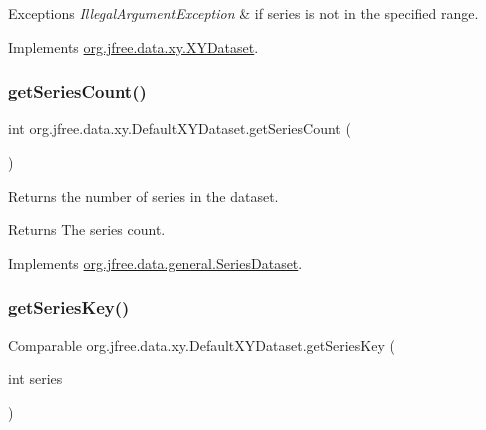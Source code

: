\begin{DoxyExceptions}{Exceptions}
{\em Illegal\+Argument\+Exception} & if {\ttfamily series} is not in the specified range. \\
\hline
\end{DoxyExceptions}


Implements \mbox{\hyperlink{interfaceorg_1_1jfree_1_1data_1_1xy_1_1_x_y_dataset_ae81f9de91dfcae45028fc8a486a119da}{org.\+jfree.\+data.\+xy.\+X\+Y\+Dataset}}.

\mbox{\label{classorg_1_1jfree_1_1data_1_1xy_1_1_default_x_y_dataset_a0e11a4936eb729adf611cb44013abc5b}} 
\subsubsection{\texorpdfstring{get\+Series\+Count()}{getSeriesCount()}}
{\footnotesize\ttfamily int org.\+jfree.\+data.\+xy.\+Default\+X\+Y\+Dataset.\+get\+Series\+Count (\begin{DoxyParamCaption}{ }\end{DoxyParamCaption})}

Returns the number of series in the dataset.

\begin{DoxyReturn}{Returns}
The series count. 
\end{DoxyReturn}


Implements \mbox{\hyperlink{interfaceorg_1_1jfree_1_1data_1_1general_1_1_series_dataset_a84fe822f5918f941d9de1ed1b73c9f58}{org.\+jfree.\+data.\+general.\+Series\+Dataset}}.

\mbox{\label{classorg_1_1jfree_1_1data_1_1xy_1_1_default_x_y_dataset_a6dfb403ab13b08ab72e484c32c2583e6}} 
\subsubsection{\texorpdfstring{get\+Series\+Key()}{getSeriesKey()}}
{\footnotesize\ttfamily Comparable org.\+jfree.\+data.\+xy.\+Default\+X\+Y\+Dataset.\+get\+Series\+Key (\begin{DoxyParamCaption}\item[{int}]{series }\end{DoxyParamCaption})}

